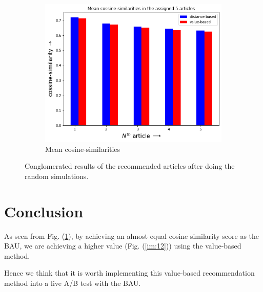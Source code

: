 \documentclass[11]{article}
\begin{document}
\begin{figure}[H]
\begin{subfigure}[t]{0.49\textwidth}
		\centering
		\includegraphics[width=1.0\linewidth]{images/cossim_recomm.png}
		\caption{Mean cosine-similarities} \label{im:22}
	\end{subfigure}	
	
	\caption{Conglomerated results of the recommended articles after doing the random simulations.} \label{im:33}
\end{figure}


\section{Conclusion}
As seen from Fig. (\ref{im:22}), by achieving an almost equal cosine similarity score as the BAU, we are achieving a higher value (Fig. (\ref{im:12})) using the value-based method.

Hence we think that it is worth implementing this value-based recommendation method into a live A/B test with the BAU.
\end{document}
